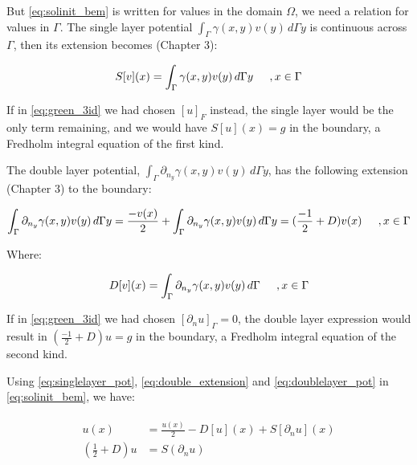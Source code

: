 But \ref{eq:solinit_bem} is written for values in the domain $\Omega$, we need a relation for values in $\Gamma$. The single layer potential $\int_{\Gamma} \gamma(x,y)v(y) \,d\Gamma y$ is continuous across $\Gamma$, then its extension becomes \cite{sauter-bem}(Chapter 3):

\begin{equation}\label{eq:singlelayer_pot}
    S[v](x) = \int_{\Gamma} \gamma(x,y)v(y) \,d\Gamma y \hspace{0.2in}, x \in \Gamma
\end{equation}

If in \ref{eq:green_3id} we had chosen $[u]_{F}$ instead, the single layer would be the only term remaining, and we would have $S[u](x) = g$ in the boundary, a Fredholm integral equation of the first kind.

The double layer potential, $\int_{\Gamma}  \partial_{n_{y}}\gamma(x,y) v(y) \,d\Gamma y$, has the following extension \cite{sauter-bem}(Chapter 3) to the boundary:

\begin{equation}\label{eq:double_extension}
    \int_{\Gamma}  \partial_{n_{y}}\gamma(x,y) v(y) \,d\Gamma y = \frac{-v(x)}{2} + \int_{\Gamma} \partial_{n_{y}}\gamma(x,y)v(y) \,d\Gamma y = (\frac{-1}{2} + D)v(x)\hspace{0.2in}, x \in \Gamma
\end{equation}

Where:

\begin{equation}\label{eq:doublelayer_pot}
    D[v](x) = \int_{\Gamma} \partial_{n_{y}}\gamma(x,y)v(y) \,d\Gamma \hspace{0.2in}, x \in \Gamma
\end{equation}

If in \ref{eq:green_3id} we had chosen $[\partial_{n}u]_{\Gamma} = 0$, the double layer expression would result in $(\frac{-1}{2} + D)u = g$ in the boundary, a Fredholm integral equation of the second kind.


Using \ref{eq:singlelayer_pot}, \ref{eq:double_extension} and \ref{eq:doublelayer_pot} in \ref{eq:solinit_bem}, we have:

\begin{align}\label{eq:sol_bem}
    \begin{split}
        u(x) & = \frac{u(x)}{2} - D[u](x) + S[\partial_{n}u](x)\\
        (\frac{1}{2} + D) u & = S(\partial_{n}u)
    \end{split}
\end{align}

